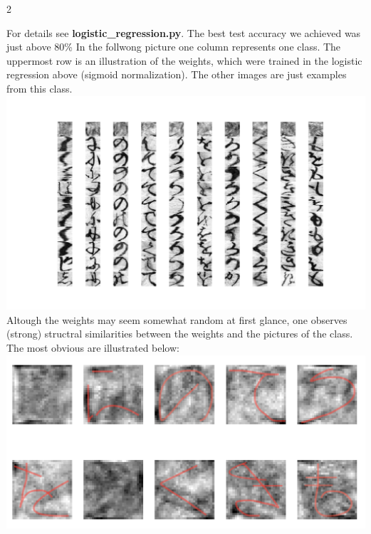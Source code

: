 \documentclass{article}
\begin{document}
\begin{ukon-infie}[3.12.17]{2}
\begin{exercise}[p=45]{}
{			}
			\question{}
			{
			For details see \textbf{logistic\_regression.py}.	
			The best test accuracy we achieved was just above 80\%}
			\question{}
			{
			In the follwong picture one column represents one class. The uppermost row is an illustration of the weights, which were trained in the logistic regression above (sigmoid normalization). The other images are just examples from this class.\\\includegraphics[scale=0.5]{weights.png}}   \\	
			Altough the weights may seem somewhat random at first glance, one observes (strong) structral similarities between the weights and the pictures of the class. The most obvious are  illustrated below:\\
			\includegraphics[scale=0.5]{weights_similarities.png}
		\end{exercise}
		

\end{ukon-infie}
\end{document}
